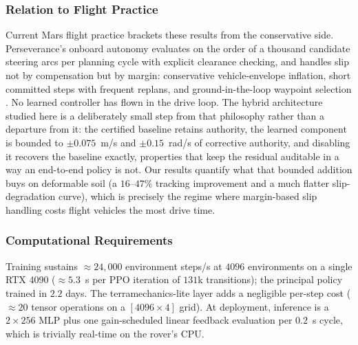 \documentclass[conference]{IEEEtran}
\begin{document}
\subsubsection{Relation to Flight Practice}
Current Mars flight practice brackets these results from the conservative side. Perseverance's onboard autonomy evaluates on the order of a thousand candidate steering arcs per planning cycle with explicit clearance checking, and handles slip not by compensation but by margin: conservative vehicle-envelope inflation, short committed steps with frequent replans, and ground-in-the-loop waypoint selection \cite{verma2023perseverance, nasaACE}. No learned controller has flown in the drive loop. The hybrid architecture studied here is a deliberately small step from that philosophy rather than a departure from it: the certified baseline retains authority, the learned component is bounded to $\pm0.075$~m/s and $\pm0.15$~rad/s of corrective authority, and disabling it recovers the baseline exactly, properties that keep the residual auditable in a way an end-to-end policy is not. Our results quantify what that bounded addition buys on deformable soil (a $16$--$47\%$ tracking improvement and a much flatter slip-degradation curve), which is precisely the regime where margin-based slip handling costs flight vehicles the most drive time.

\subsubsection{Computational Requirements}
Training sustains $\approx\!24{,}000$ environment steps/s at $4096$ environments on a single RTX 4090 ($\approx\!5.3$~s per PPO iteration of $131$k transitions); the principal policy trained in $2.2$ days. The terramechanics-lite layer adds a negligible per-step cost ($\approx\!20$ tensor operations on a $[4096\times4]$ grid). At deployment, inference is a $2\times256$ MLP plus one gain-scheduled linear feedback evaluation per $0.2$~s cycle, which is trivially real-time on the rover's CPU.
\end{document}
